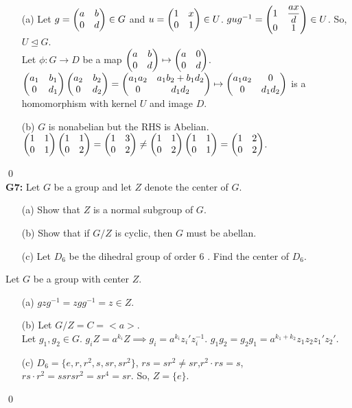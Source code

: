 \begin{itemize}
	\item[(a)] Let $ g=\begin{pmatrix} a & b\\ 0 & d \end{pmatrix} \in G$ and $ u=\begin{pmatrix} 1 & x\\ 0 & 1 \end{pmatrix} \in U $. $ gug^{-1}=\begin{pmatrix} 1 & \dfrac{ax}{d}\\ 0 & 1 \end{pmatrix} \in U$. So, $ U\unlhd G $.\\
	Let $ \phi:G\to D $ be a map $ \begin{pmatrix} a & b\\ 0 & d \end{pmatrix}\mapsto \begin{pmatrix} a & 0\\ 0 & d \end{pmatrix} $.\\
	$ \begin{pmatrix} a_1 & b_1\\ 0 & d_1 \end{pmatrix}\begin{pmatrix} a_2 & b_2\\ 0 & d_2 \end{pmatrix}= \begin{pmatrix} a_1a_2 & a_1b_2 + b_1d_2\\ 0 & d_1d_2 \end{pmatrix}\mapsto \begin{pmatrix} a_1a_2 & 0\\ 0 & d_1d_2 \end{pmatrix} $ is a homomorphism with kernel $ U $ and image $ D $.
	\item[(b)] $ G $ is nonabelian but the RHS is Abelian.\\
	$ \begin{pmatrix} 1 & 1\\ 0 & 1 \end{pmatrix}\begin{pmatrix} 1 & 1\\ 0 & 2 \end{pmatrix}=\begin{pmatrix} 1 & 3\\ 0 & 2 \end{pmatrix} \ne \begin{pmatrix} 1 & 1\\ 0 & 2 \end{pmatrix}\begin{pmatrix} 1 & 1\\ 0 & 1 \end{pmatrix}= \begin{pmatrix} 1 & 2\\ 0 & 2 \end{pmatrix} $.
\end{itemize}
\qed\\
\textbf{G7:} Let $G$ be a group and let $Z$ denote the center of $G$.
\begin{itemize}
	\item[(a)] Show that $Z$ is a normal subgroup of $G$.
	\item[(b)] Show that if $G / Z$ is cyclic, then $G$ must be abellan.
	\item[(c)] Let $D_6$ be the dihedral group of order 6 . Find the center of $D_6$.
\end{itemize}
\soln Let $ G $ be a group with center $ Z $.\\
\begin{itemize}
	\item[(a)] $ gzg^{-1}= zgg^{-1}=z\in Z $.
	\item[(b)] Let $ G/Z = C= <a>  $.\\
	 Let $ g_1,g_2\in G $. $ g_i Z= a^{k_i}Z \implies g_i = a^{k_i} z_i' z_i^{-1}  $. $ g_1g_2 = g_2g_1 = a^{k_1+k_2}z_1z_2z_1'z_2' $.
	 \item[(c)] $ D_6 = \{e,r,r^2,s,sr,sr^2\} $, $ rs=sr^2\ne sr $,$ r^2\cdot rs= s$, $ rs\cdot r^2 = ssrsr^2=sr^4=sr$. So, $ Z=\{e\} $.
\end{itemize}
\qed\\

